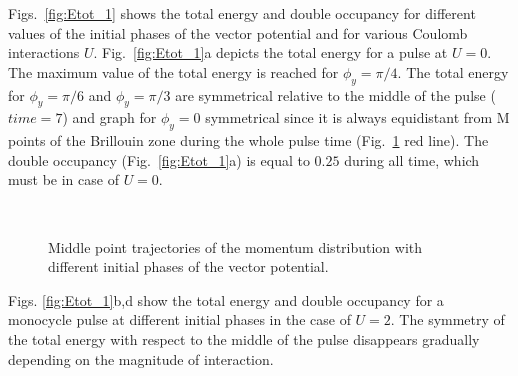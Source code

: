 Figs.~\ref{fig:Etot_1} shows the total energy and double occupancy for different values of the initial phases of the vector potential and for various Coulomb interactions $U$. Fig.~\ref{fig:Etot_1}a depicts the total energy for a pulse at $U=0$. The maximum value of the total energy is reached for $\phi_y=\pi /4$. The total energy for $\phi_y=\pi /6$ and $\phi_y=\pi /3$ are symmetrical relative to the middle of the pulse ($time=7$) and graph for $\phi_y=0$ symmetrical since it is always equidistant from M points of the Brillouin zone during the whole pulse time (Fig.~\ref{fig:Pulse_p_1} red line). The double occupancy (Fig.~\ref{fig:Etot_1}a) is equal to $0.25$ during all time, which must be in case of $U=0$.


\begin{figure}[h!]
 \\
\caption{Middle point trajectories of the momentum distribution with different initial phases of the vector potential.}
\label{fig:Pulse_p_1}
\end{figure}
Figs. \ref{fig:Etot_1}b,d show the total energy and double occupancy for a monocycle pulse at different initial phases in the case of $U=2$. The symmetry of the total energy with respect to the middle of the pulse disappears gradually depending on the magnitude of interaction.

